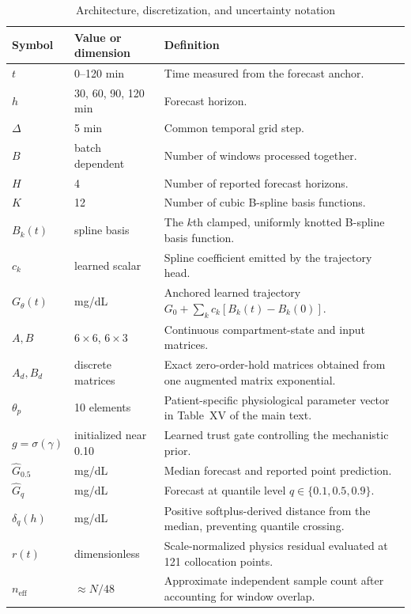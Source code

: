 \documentclass[10pt]{article}
\begin{document}
\begin{table}[h!]
\centering
\caption{Architecture, discretization, and uncertainty notation}
\label{tab:arch}
\footnotesize
\begin{tabular}{lll}
\toprule
Symbol & Value or dimension & Definition \\
\midrule
$t$ & 0--120 min & Time measured from the forecast anchor. \\
$h$ & 30, 60, 90, 120 min & Forecast horizon. \\
$\Delta$ & 5 min & Common temporal grid step. \\
$B$ & batch dependent & Number of windows processed together. \\
$H$ & 4 & Number of reported forecast horizons. \\
$K$ & 12 & Number of cubic B-spline basis functions. \\
$B_k(t)$ & spline basis & The $k$th clamped, uniformly knotted B-spline basis function. \\
$c_k$ & learned scalar & Spline coefficient emitted by the trajectory head. \\
$G_\theta(t)$ & mg/dL & Anchored learned trajectory $G_0 + \sum_k c_k[B_k(t) - B_k(0)]$. \\
$A, B$ & $6\times6$, $6\times3$ & Continuous compartment-state and input matrices. \\
$A_d, B_d$ & discrete matrices & Exact zero-order-hold matrices obtained from one augmented matrix exponential. \\
$\theta_p$ & 10 elements & Patient-specific physiological parameter vector in Table~XV of the main text. \\
$g = \sigma(\gamma)$ & initialized near 0.10 & Learned trust gate controlling the mechanistic prior. \\
$\hat{G}_{0.5}$ & mg/dL & Median forecast and reported point prediction. \\
$\hat{G}_q$ & mg/dL & Forecast at quantile level $q \in \{0.1, 0.5, 0.9\}$. \\
$\delta_q(h)$ & mg/dL & Positive softplus-derived distance from the median, preventing quantile crossing. \\
$r(t)$ & dimensionless & Scale-normalized physics residual evaluated at 121 collocation points. \\
$n_{\text{eff}}$ & $\approx N/48$ & Approximate independent sample count after accounting for window overlap. \\
\bottomrule
\end{tabular}
\end{table}
\end{document}
